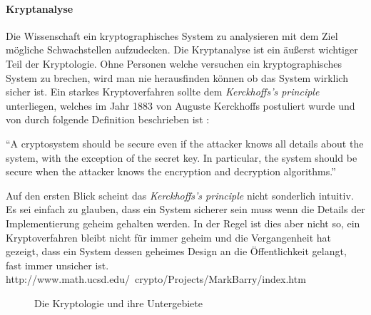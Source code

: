 \paragraph{Kryptanalyse}
Die Wissenschaft ein kryptographisches System zu analysieren mit dem Ziel mögliche
Schwachstellen aufzudecken. Die Kryptanalyse ist ein äußerst wichtiger Teil der
Kryptologie. Ohne Personen welche versuchen ein kryptographisches System zu
brechen, wird man nie herausfinden können ob das System wirklich sicher ist.
Ein starkes Kryptoverfahren sollte dem \textit{Kerckhoffs's principle} unterliegen, welches
im Jahr 1883 von Auguste Kerckhoffs postuliert wurde und von \citeauthor{BOOK:KRYPTOGRAPHIE}
durch folgende Definition beschrieben ist \parencite*[11]{BOOK:KRYPTOGRAPHIE}:
\begin{definition}
\enquote{A cryptosystem should be secure even if the attacker knows all details about
the system, with the exception of the secret key. In particular, the system should be secure when
the attacker knows the encryption and decryption algorithms.}
\end{definition}
Auf den ersten Blick scheint das \textit{Kerckhoffs's principle} nicht sonderlich intuitiv.
Es sei einfach zu glauben, dass ein System
sicherer sein muss wenn die Details der Implementierung geheim gehalten werden.
In der Regel ist dies aber nicht so, ein Kryptoverfahren bleibt nicht für immer geheim und die
Vergangenheit hat gezeigt, dass ein System dessen geheimes Design an die Öffentlichkeit
gelangt, fast immer unsicher ist. http://www.math.ucsd.edu/~crypto/Projects/MarkBarry/index.htm
\begin{figure}
\begin{center}


\end{center}
\caption{Die Kryptologie und ihre Untergebiete}
\label{fig:kryptologie}
\end{figure}
